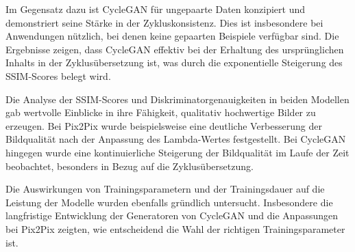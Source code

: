 Im Gegensatz dazu ist CycleGAN für ungepaarte Daten konzipiert und demonstriert seine Stärke in der Zykluskonsistenz. Dies ist insbesondere bei Anwendungen nützlich, bei denen keine gepaarten Beispiele verfügbar sind. Die Ergebnisse zeigen, dass CycleGAN effektiv bei der Erhaltung des ursprünglichen Inhalts in der Zyklusübersetzung ist, was durch die exponentielle Steigerung des SSIM-Scores belegt wird.

Die Analyse der SSIM-Scores und Diskriminatorgenauigkeiten in beiden Modellen gab wertvolle Einblicke in ihre Fähigkeit, qualitativ hochwertige Bilder zu erzeugen. Bei Pix2Pix wurde beispielsweise eine deutliche Verbesserung der Bildqualität nach der Anpassung des Lambda-Wertes festgestellt. Bei CycleGAN hingegen wurde eine kontinuierliche Steigerung der Bildqualität im Laufe der Zeit beobachtet, besonders in Bezug auf die Zyklusübersetzung.

Die Auswirkungen von Trainingsparametern und der Trainingsdauer auf die Leistung der Modelle wurden ebenfalls gründlich untersucht. Insbesondere die langfristige Entwicklung der Generatoren von CycleGAN und die Anpassungen bei Pix2Pix zeigten, wie entscheidend die Wahl der richtigen Trainingsparameter ist. 